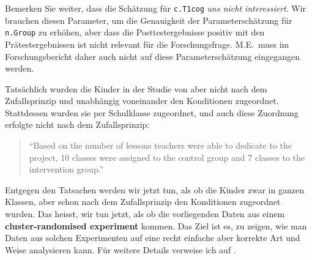 \documentclass[oneside, 10pt]{book}\usepackage[]{graphicx}\usepackage[]{xcolor}
\begin{document}
Bemerken Sie weiter, dass die Schätzung für \texttt{c.T1cog}
\emph{uns nicht interessiert}. Wir brauchen diesen Parameter,
um die Genauigkeit der Parameterschätzung für \texttt{n.Group}
zu erhöhen, aber dass die Posttestergebnisse positiv
mit den Prätestergebnissen ist nicht relevant für
die Forschungsfrage. M.E.\ muss im Forschungsbericht daher
auch nicht auf diese Parameterschätzung eingegangen werden.

Tatsächlich wurden die Kinder in der Studie von \citet{Hicks2021}
aber nicht nach dem Zufallsprinzip und unabhängig voneinander
den Konditionen zugeordnet. Stattdessen wurden sie per Schulklasse
zugeordnet, und auch diese Zuordnung erfolgte nicht nach
dem Zufallsprinzip:
\begin{quote}
``Based on the number of lessons teachers were able to 
dedicate to the project, 10 classes were assigned to 
the control group and
7 classes to the intervention group.'' \citep[][S.~6]{Hicks2021}
\end{quote}
Entgegen den Tatsachen werden wir jetzt tun, als ob die Kinder zwar
in ganzen Klassen, aber schon nach dem Zufallsprinzip den Konditionen
zugeordnet wurden. Das heisst, wir tun jetzt, als ob die vorliegenden
Daten aus einem \textbf{cluster-randomised experiment} kommen.
Das Ziel ist es, zu zeigen, wie man Daten aus solchen Experimenten
auf eine recht einfache aber korrekte Art und Weise analysieren kann.
Für weitere Details verweise ich auf \citet{Vanhove2015,Vanhove2020c}.
\end{document}
